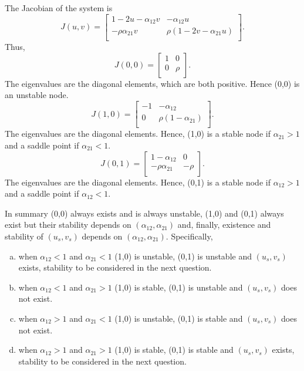 \documentclass[]{article}
\newcommand{\bb}{\begin{equation}}
\newcommand{\ee}{\end{equation}}
\renewcommand{\l}{\left(}
\renewcommand{\r}{\right)}
\begin{document}
\begin{Answ}
\subsubsection{}
The Jacobian of the system is
\bb
J(u,v)=\left[ {\begin{array}{cc}
   1-2u-\alpha_{12} v & -\alpha_{12}u \\
   -\rho\alpha_{21}v & \rho\l 1-2v-\alpha_{21} u\r \\
  \end{array} } \right].
\ee
Thus,
\bb
J(0,0)=\left[ {\begin{array}{cc}
   1 & 0 \\
   0 & \rho \\
  \end{array} } \right].
\ee
The eigenvalues are the diagonal elements, which are both positive. Hence (0,0) is an unstable node.
\bb
J(1,0)=\left[ {\begin{array}{cc}
   -1 & -\alpha_{12} \\
   0 & \rho(1-\alpha_{21}) \\
  \end{array} } \right].
\ee
The eigenvalues are the diagonal elements. Hence, (1,0) is a stable node if $\alpha_{21}>1$ and a saddle point if $\alpha_{21}<1$.
\bb
J(0,1)=\left[ {\begin{array}{cc}
   1-\alpha_{12} & 0 \\
   -\rho\alpha_{21} & -\rho \\
  \end{array} } \right].
\ee
The eigenvalues are the diagonal elements. Hence, (0,1) is a stable node if $\alpha_{12}>1$ and a saddle point if $\alpha_{12}<1$.


In summary (0,0) always exists and is always unstable, (1,0) and (0,1) always exist but their stability depends on $(\alpha_{12},\alpha_{21})$ and, finally, existence and stability of $(u_s,v_s)$ depends on $(\alpha_{12},\alpha_{21})$. Specifically,
\begin{enumerate}[(a)]
\item when $\alpha_{12}<1$ and $\alpha_{21}<1$ (1,0) is unstable, (0,1) is unstable and $(u_s, v_s)$ exists, stability to be considered in the next question.
\item when $\alpha_{12}<1$ and $\alpha_{21}>1$ (1,0) is stable, (0,1) is unstable and $(u_s,v_s)$ does not exist.
\item when $\alpha_{12}>1$ and $\alpha_{21}<1$ (1,0) is unstable, (0,1) is stable and $(u_s,v_s)$ does not exist.
\item when $\alpha_{12}>1$ and $\alpha_{21}>1$ (1,0) is stable, (0,1) is stable and $(u_s, v_s)$ exists, stability to be considered in the next question.
\end{enumerate}


\end{Answ}
\end{document}
